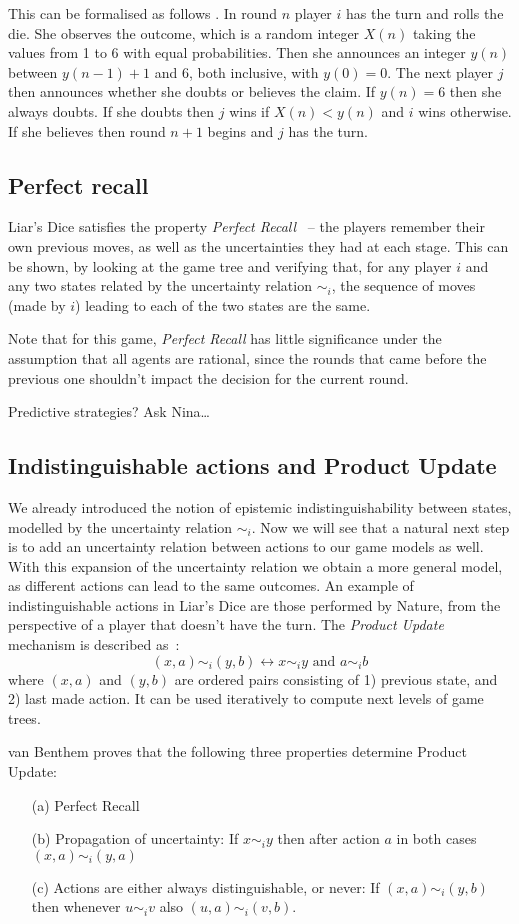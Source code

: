 This can be formalised as follows \cite{ferguson1991}. In round $n$ player $i$ has the turn and rolls the die. She observes the outcome, which is a random integer $X(n)$ taking the values from 1 to 6 with equal probabilities. Then she announces an integer $y(n)$ between $y(n-1)+1$ and 6, both inclusive, with $y(0) = 0$. The next player $j$ then announces whether she doubts or believes the claim. If $y(n)=6$ then she always doubts. If she doubts then $j$ wins if $X(n) < y(n)$ and $i$ wins otherwise. If she believes then round $n+1$ begins and $j$ has the turn.

\subsection{Perfect recall}
Liar's Dice satisfies the property \emph{Perfect Recall}~\cite{benthem2001a} -- the players remember their own previous moves, as well as the uncertainties they had at each stage. This can be shown, by looking at the game tree and verifying that, for any player $i$ and any two states related by the uncertainty relation $\sim_i$, the sequence of moves (made by $i$) leading to each of the two states are the same. 

Note that for this game, \emph{Perfect Recall} has little significance under the assumption that all agents are rational, since the rounds that came before the previous one shouldn't impact the decision for the current round.

{ \color{red} Predictive strategies? Ask Nina\dots }

\subsection{Indistinguishable actions and Product Update}
We already introduced the notion of epistemic indistinguishability between states, modelled by the uncertainty relation $\sim_i$. Now we will see that a natural next step is to add an uncertainty relation between actions to our game models as well. With this expansion of the uncertainty relation we obtain a more general model, as different actions can lead to the same outcomes. An example of indistinguishable actions in Liar's Dice are those performed by Nature, from the perspective of a player that doesn't have the turn. The \emph{Product Update} mechanism is described as~\cite{benthem2001a}:
$$
(x,a)\sim_i(y,b) \leftrightarrow x\sim_i y \mbox{ and } a\sim_i b
$$
where $(x,a)$ and $(y,b)$ are ordered pairs consisting of 1) previous state, and 2) last made action. It can be used iteratively to compute next levels of game trees.

van Benthem proves that the following three properties determine Product Update:
\begin{enumerate}
\item[(a)] Perfect Recall
\item[(b)] Propagation of uncertainty: If $x\sim_i y$ then after action $a$ in both cases $(x,a)\sim_i (y,a)$
\item[(c)] Actions are either always distinguishable, or never: If $(x,a)\sim_i (y,b)$ then whenever $u\sim_i v$ also $(u,a)\sim_i (v,b)$.
\end{enumerate}